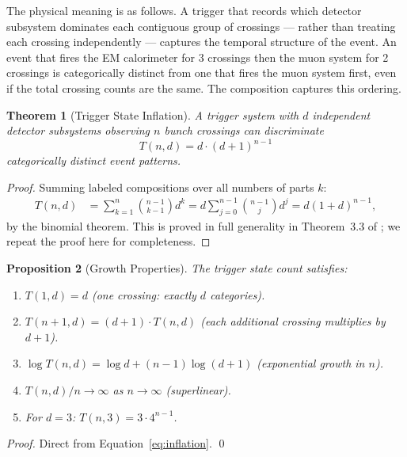 \documentclass[twocolumn,10pt,a4paper]{article}
\theoremstyle{thmstyle}
\newtheorem{theorem}{Theorem}[section]
\newtheorem{proposition}[theorem]{Proposition}
\theoremstyle{definition}
\theoremstyle{remark}
\begin{document}
The physical meaning is as follows. A trigger that records which detector
subsystem dominates each contiguous group of crossings — rather than
treating each crossing independently — captures the temporal structure of
the event. An event that fires the EM calorimeter for 3 crossings then the
muon system for 2 crossings is categorically distinct from one that fires
the muon system first, even if the total crossing counts are the same. The
composition captures this ordering.

\begin{theorem}[Trigger State Inflation]
\label{thm:inflation}
A trigger system with $d$ independent detector subsystems observing $n$
bunch crossings can discriminate
\begin{equation}
\boxed{T(n,d) = d \cdot (d+1)^{n-1}}
\label{eq:inflation}
\end{equation}
categorically distinct event patterns.
\end{theorem}

\begin{proof}
Summing labeled compositions over all numbers of parts $k$:
\begin{align}
T(n,d)
&= \sum_{k=1}^{n} \binom{n-1}{k-1} d^k
= d \sum_{j=0}^{n-1} \binom{n-1}{j} d^{j}
= d(1+d)^{n-1},
\end{align}
by the binomial theorem.
This is proved in full generality in Theorem~3.3 of \citet{companion:math};
we repeat the proof here for completeness.
\end{proof}

\begin{proposition}[Growth Properties]
\label{prop:growth}
The trigger state count satisfies:
\begin{enumerate}[nosep,label=(\roman*)]
\item $T(1,d) = d$ (one crossing: exactly $d$ categories).
\item $T(n+1,d) = (d+1) \cdot T(n,d)$ (each additional crossing multiplies
by $d+1$).
\item $\log T(n,d) = \log d + (n-1)\log(d+1)$ (exponential growth in $n$).
\item $T(n,d)/n \to \infty$ as $n \to \infty$ (superlinear).
\item For $d = 3$: $T(n,3) = 3 \cdot 4^{n-1}$.
\end{enumerate}
\end{proposition}

\begin{proof}
Direct from Equation~\eqref{eq:inflation}. \qed
\end{proof}
\end{document}
